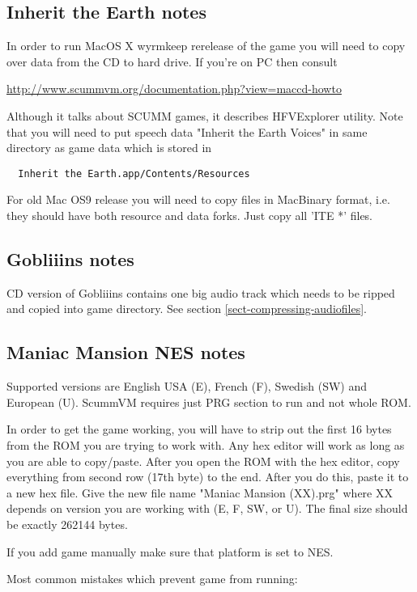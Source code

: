 \subsection{Inherit the Earth notes}
In order to run MacOS X wyrmkeep rerelease of the game you will need to copy
over data from the CD to hard drive. If you're on PC then consult

\url{http://www.scummvm.org/documentation.php?view=maccd-howto}

Although it talks about SCUMM games, it describes HFVExplorer utility. Note
that you will need to put speech data "Inherit the Earth Voices" in same
directory as game data which is stored in

\begin{verbatim}
  Inherit the Earth.app/Contents/Resources
\end{verbatim}

For old Mac OS9 release you will need to copy files in MacBinary format,
i.e. they should have both resource and data forks. Just copy all 'ITE *' files.


\subsection{Gobliiins notes}
CD version of Gobliiins contains one big audio track which needs to be ripped
and copied into game directory. See section \ref{sect-compressing-audiofiles}.


\subsection{Maniac Mansion NES notes}
Supported versions are English USA (E), French (F), Swedish (SW) and 
European (U). ScummVM requires just PRG section to run and not whole ROM.

In order to get the game working, you will have to strip out the first
16 bytes from the ROM you are trying to work with. Any hex editor will work 
as long as you are able to copy/paste.  After you open the ROM with the 
hex editor, copy everything from second row (17th byte) to the end. After
you do this, paste it to a new hex file. Give the new file name 
"Maniac Mansion (XX).prg" where XX depends on version you are  working 
with (E, F, SW, or U).  The final size should be exactly 262144 bytes.

If you add game manually make sure that platform is set to NES.

Most common mistakes which prevent game from running:

